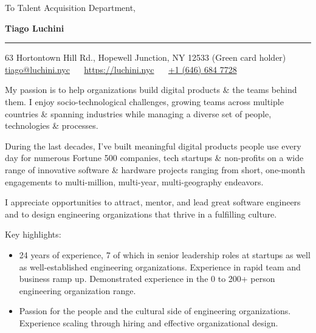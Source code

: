 \documentclass{letter} %
\begin{document}
\signature{Tiago Luchini}                  %
\longindentation=0pt                       %
\let\raggedleft\raggedright                %
 
 
\begin{letter}{To Talent Acquisition Department,}


\begin{flushleft}
{\large\bf Tiago Luchini}
\end{flushleft}
\medskip\hrule
\begin{flushright}
\hfill 63 Hortontown Hill Rd., Hopewell Junction, NY 12533 (Green card holder)\\ \hfill
\href{mailto:tiago@luchini.nyc}{tiago@luchini.nyc} ~~
\href{https://luchini.nyc}{https://luchini.nyc} ~~ \href{tel:+16466847728}{+1
  (646) 684 7728}
\end{flushright}
\vfill %
 
\opening{}

\noindent My passion is to help organizations build digital products \&
the teams behind them. I enjoy socio-technological challenges, growing
teams across multiple countries \& spanning industries while managing a
diverse set of people, technologies \& processes.

\noindent During the last decades, I've built meaningful digital
products people use every day for numerous Fortune 500 companies, tech
startups \& non-profits on a wide range of innovative software \&
hardware projects ranging from short, one-month engagements to
multi-million, multi-year, multi-geography endeavors.

\noindent I appreciate opportunities to attract, mentor, and lead
great software engineers and to design engineering organizations that
thrive in a fulfilling culture.

\noindent Key highlights:

\begin{itemize}
\item 24 years of experience, 7 of which in senior leadership roles at
  startups as well as well-established engineering
  organizations. Experience in rapid team and business ramp
  up. Demonstrated experience in the 0 to 200+ person engineering
  organization range.

\item Passion for the people and the cultural side of engineering
  organizations. Experience scaling through hiring and effective
  organizational design.


\end{itemize}
\end{letter}
\end{document}
